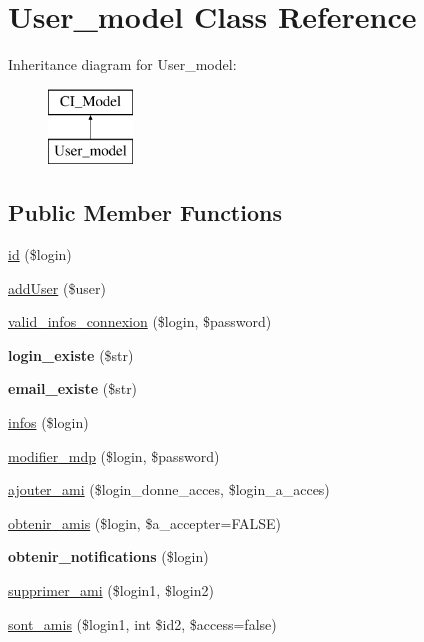 \hypertarget{class_user__model}{}\section{User\+\_\+model Class Reference}
\label{class_user__model}
Inheritance diagram for User\+\_\+model\+:\begin{figure}[H]
\begin{center}
\leavevmode
\includegraphics[height=2.000000cm]{class_user__model}
\end{center}
\end{figure}
\subsection*{Public Member Functions}
\begin{DoxyCompactItemize}
\item 
\hyperlink{class_user__model_ae3c97430ddfbb524172fe62687493762}{id} (\$login)
\item 
\hyperlink{class_user__model_abdfab30e2e8e5562e761a2228af18c3b}{add\+User} (\$user)
\item 
\hyperlink{class_user__model_ad956699f65b6a767bdf9ce2d251633b2}{valid\+\_\+infos\+\_\+connexion} (\$login, \$password)
\item 
\mbox{\label{class_user__model_a3204c52d23a035d36787a16d82db1333}} 
{\bfseries login\+\_\+existe} (\$str)
\item 
\mbox{\label{class_user__model_a4084ea600d7d896ff95d9248a7a25616}} 
{\bfseries email\+\_\+existe} (\$str)
\item 
\hyperlink{class_user__model_a40e51a5c6fc819d5c0f2e678a124d60e}{infos} (\$login)
\item 
\hyperlink{class_user__model_a1e8eb7d545bc221a640bffdebf063e3e}{modifier\+\_\+mdp} (\$login, \$password)
\item 
\hyperlink{class_user__model_af67174e59f20721772935e2318be5e4a}{ajouter\+\_\+ami} (\$login\+\_\+donne\+\_\+acces, \$login\+\_\+a\+\_\+acces)
\item 
\hyperlink{class_user__model_a778aaa6e58fc26c945fffba005867051}{obtenir\+\_\+amis} (\$login, \$a\+\_\+accepter=F\+A\+L\+SE)
\item 
\mbox{\label{class_user__model_a30fbd50d8c0d3312dee36d8de939ebca}} 
{\bfseries obtenir\+\_\+notifications} (\$login)
\item 
\hyperlink{class_user__model_a6bac1a29e9d14095868f8d38b2a814b2}{supprimer\+\_\+ami} (\$login1, \$login2)
\item 
\hyperlink{class_user__model_a54a357608c9913546f397fad6270e4fb}{sont\+\_\+amis} (\$login1, int \$id2, \$access=false)
\end{DoxyCompactItemize}


